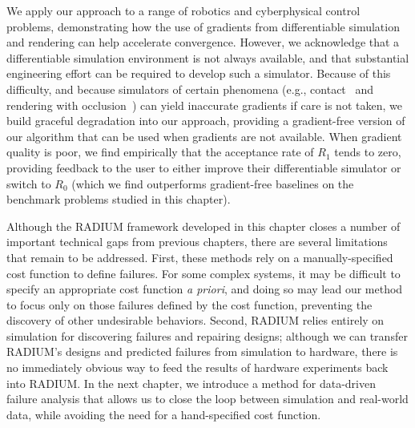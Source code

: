 We apply our approach to a range of robotics and cyberphysical control problems, demonstrating how the use of gradients from differentiable simulation and rendering can help accelerate convergence. However, we acknowledge that a differentiable simulation environment is not always available, and that substantial engineering effort can be required to develop such a simulator. Because of this difficulty, and because simulators of certain phenomena (e.g., contact~\cite{huDiffTaichiDifferentiableProgramming2019} and rendering with occlusion~\cite{zhaoPhysicsbasedDifferentiableRendering2020}) can yield inaccurate gradients if care is not taken, we build graceful degradation into our approach, providing a gradient-free version of our algorithm that can be used when gradients are not available. When gradient quality is poor, we find empirically that the acceptance rate of $R_1$ tends to zero, providing feedback to the user to either improve their differentiable simulator or switch to $R_0$ (which we find outperforms gradient-free baselines on the benchmark problems studied in this chapter).

Although the RADIUM framework developed in this chapter closes a number of important technical gaps from previous chapters, there are several limitations that remain to be addressed. First, these methods rely on a manually-specified cost function to define failures. For some complex systems, it may be difficult to specify an appropriate cost function \textit{a priori}, and doing so may lead our method to focus only on those failures defined by the cost function, preventing the discovery of other undesirable behaviors. Second, RADIUM relies entirely on simulation for discovering failures and repairing designs; although we can transfer RADIUM's designs and predicted failures from simulation to hardware, there is no immediately obvious way to feed the results of hardware experiments back into RADIUM. In the next chapter, we introduce a method for data-driven failure analysis that allows us to close the loop between simulation and real-world data, while avoiding the need for a hand-specified cost function.
